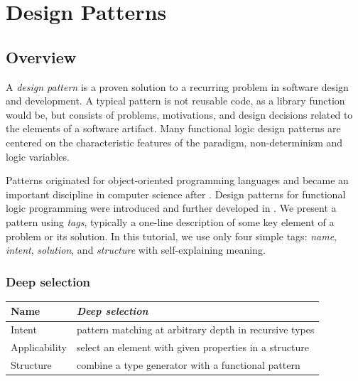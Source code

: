 \chapter{Design Patterns}

\section{Overview}

A \emph{design pattern}
is a proven solution to a recurring
problem in software design and development.
A typical pattern is not reusable code, as a library function would be,
but consists of problems, motivations, and design decisions
related to the elements of a software artifact.
Many functional logic design patterns are centered on the characteristic
features of the paradigm, non-determinism and logic variables.

Patterns originated for object-oriented programming languages
and became an important discipline in computer
science after \cite{GammaEtAl94}.
Design patterns for functional logic programming
were introduced and further developed in
\cite{AntoyHanus02FLOPS,AntoyHanus11WFLP}.
We present a pattern using \emph{tags},
typically a one-line description of some key element
of a problem or its solution.
In this tutorial, we use only four simple tags:
\emph{name},
\emph{intent},
\emph{solution}, and
\emph{structure}
with self-explaining meaning.

\subsection{Deep selection}\label{sec-Deep-selection}

\begin{center}
\begin{tabular}{@{} | *{2}{@{\hspace{3pt}} l @{\hspace{3pt}} |} @{}}
\hline
Name & \emph{Deep selection} \\
\hline 
Intent & pattern matching at arbitrary depth in recursive types \\
\hline
Applicability & select an element with given properties in a structure \\
\hline
Structure & combine a type generator with a functional pattern \\
\hline
\end{tabular}
\end{center}


